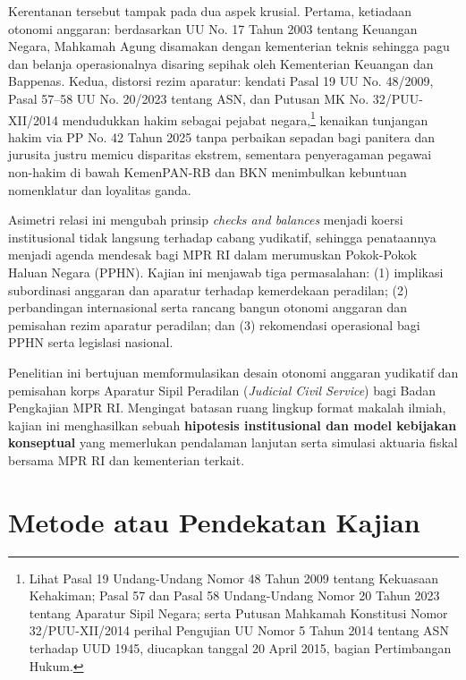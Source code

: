 \documentclass[12pt,a4paper,twocolumn]{article}
\begin{document}
Kerentanan tersebut tampak pada dua aspek krusial. Pertama, ketiadaan otonomi anggaran: berdasarkan UU No. 17 Tahun 2003 tentang Keuangan Negara, Mahkamah Agung disamakan dengan kementerian teknis sehingga pagu dan belanja operasionalnya disaring sepihak oleh Kementerian Keuangan dan Bappenas. Kedua, distorsi rezim aparatur: kendati Pasal 19 UU No. 48/2009, Pasal 57--58 UU No. 20/2023 tentang ASN, dan Putusan MK No. 32/PUU-XII/2014 mendudukkan hakim sebagai pejabat negara,\footnote{Lihat Pasal 19 Undang-Undang Nomor 48 Tahun 2009 tentang Kekuasaan Kehakiman; Pasal 57 dan Pasal 58 Undang-Undang Nomor 20 Tahun 2023 tentang Aparatur Sipil Negara; serta Putusan Mahkamah Konstitusi Nomor 32/PUU-XII/2014 perihal Pengujian UU Nomor 5 Tahun 2014 tentang ASN terhadap UUD 1945, diucapkan tanggal 20 April 2015, bagian Pertimbangan Hukum.} kenaikan tunjangan hakim via PP No. 42 Tahun 2025 tanpa perbaikan sepadan bagi panitera dan jurusita justru memicu disparitas ekstrem, sementara penyeragaman pegawai non-hakim di bawah KemenPAN-RB dan BKN menimbulkan kebuntuan nomenklatur dan loyalitas ganda.

Asimetri relasi ini mengubah prinsip \textit{checks and balances} menjadi koersi institusional tidak langsung terhadap cabang yudikatif, sehingga penataannya menjadi agenda mendesak bagi MPR RI dalam merumuskan Pokok-Pokok Haluan Negara (PPHN). Kajian ini menjawab tiga permasalahan: (1) implikasi subordinasi anggaran dan aparatur terhadap kemerdekaan peradilan; (2) perbandingan internasional serta rancang bangun otonomi anggaran dan pemisahan rezim aparatur peradilan; dan (3) rekomendasi operasional bagi PPHN serta legislasi nasional.

Penelitian ini bertujuan memformulasikan desain otonomi anggaran yudikatif dan pemisahan korps Aparatur Sipil Peradilan (\textit{Judicial Civil Service}) bagi Badan Pengkajian MPR RI. Mengingat batasan ruang lingkup format makalah ilmiah, kajian ini menghasilkan sebuah \textbf{hipotesis institusional dan model kebijakan konseptual} yang memerlukan pendalaman lanjutan serta simulasi aktuaria fiskal bersama MPR RI dan kementerian terkait.

\section{Metode atau Pendekatan Kajian}
\end{document}
